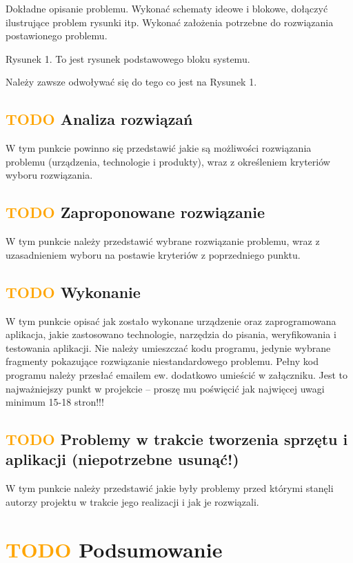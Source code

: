 \documentclass[11pt,titlepage]{article}
\begin{document}
Dokładne opisanie problemu. Wykonać schematy ideowe i blokowe, dołączyć ilustrujące problem rysunki itp. Wykonać założenia potrzebne do rozwiązania postawionego problemu.

Rysunek 1. To jest rysunek podstawowego bloku systemu.

Należy zawsze odwoływać się do tego co jest na Rysunek 1.

\subsection{\textcolor{orange}{TODO} Analiza rozwiązań}

W tym punkcie powinno się przedstawić jakie są możliwości rozwiązania problemu (urządzenia, technologie i produkty), wraz z określeniem kryteriów wyboru rozwiązania.

\subsection{\textcolor{orange}{TODO} Zaproponowane rozwiązanie}

W tym punkcie należy przedstawić wybrane rozwiązanie problemu, wraz z uzasadnieniem wyboru na postawie kryteriów z poprzedniego punktu.

\subsection{\textcolor{orange}{TODO} Wykonanie}

W tym punkcie opisać jak zostało wykonane urządzenie oraz zaprogramowana aplikacja, jakie zastosowano technologie, narzędzia do pisania, weryfikowania i testowania aplikacji. Nie należy umieszczać kodu programu, jedynie wybrane fragmenty pokazujące rozwiązanie niestandardowego problemu. Pełny kod programu należy przesłać emailem ew. dodatkowo umieścić w załączniku.
Jest to najważniejszy punkt w projekcie – proszę mu poświęcić jak najwięcej uwagi minimum 15-18 stron!!!

\subsection{\textcolor{orange}{TODO} Problemy w trakcie tworzenia sprzętu i aplikacji (niepotrzebne usunąć!)}

W tym punkcie należy przedstawić jakie były problemy przed którymi stanęli autorzy projektu w trakcie jego realizacji i jak je rozwiązali.

\section{\textcolor{orange}{TODO} Podsumowanie}
\end{document}
